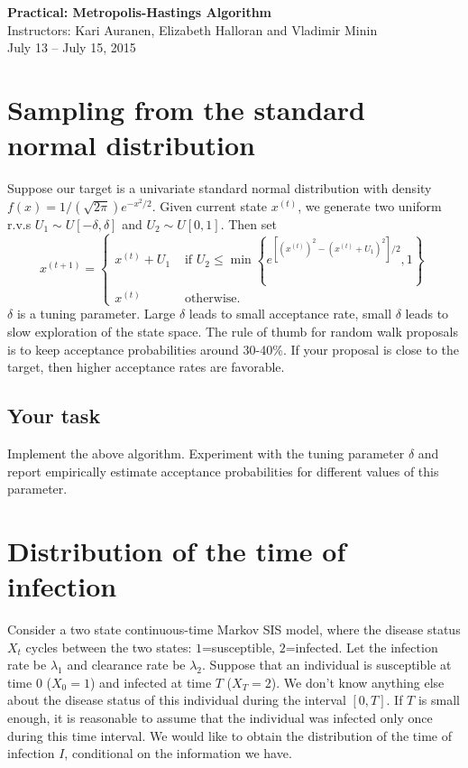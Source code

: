 \documentclass[11pt]{article}
\numberwithin{algorithm}{section}
\theoremstyle{remark}
\theoremstyle{definition}
\numberwithin{equation}{section}
\numberwithin{figure}{section}
\begin{document}


\begin{center}
  \textbf{\Large Practical: Metropolis-Hastings Algorithm}\\
  {\large Instructors: Kari Auranen, Elizabeth Halloran and Vladimir Minin}\\
  {\large July 13 -- July 15, 2015}
\end{center}

\section*{Sampling from the standard normal distribution}
Suppose our target is a univariate standard normal distribution with density $f(x) = 1/(\sqrt{2\pi})e^{-x^2/2}$.
Given current state $x^{(t)}$, we generate two uniform r.v.s $U_1 \sim U[-\delta,\delta]$ and 
$U_2 \sim U[0,1]$. Then set
\[
x^{(t+1)} = 
\begin{cases}
  x^{(t)} + U_1 &\text{ if } U_2 \le \min\left\{e^{\left[\left(x^{(t)}\right)^2 - (x^{(t)}+U_1)^2\right]/2},1\right\} \\
  x^{(t)} & \text{ otherwise}.
\end{cases}
\]
$\delta$ is a tuning parameter. Large $\delta$ leads to small acceptance rate, small $\delta$ leads to slow
exploration of the state space. The rule of thumb for random walk proposals is to keep acceptance probabilities
around 30-40\%. If your proposal is close to the target, then higher acceptance rates are favorable.


\subsection*{Your task}
Implement the above algorithm. Experiment with the tuning parameter $\delta$ and report empirically estimate
acceptance probabilities for different values of this parameter.

\section*{Distribution of the time of infection}
Consider a two state continuous-time Markov SIS model, where the disease status $X_t$ cycles between the two states: 
$1$=susceptible, $2$=infected. Let the infection rate be $\lambda_1$ and clearance rate be $\lambda_2$.
Suppose that an individual is susceptible at time $0$ ($X_0 = 1$) and infected at time $T$ ($X_T=2$). We don't know
anything else about the disease status of this individual during the interval $[0,T]$. If $T$ is small enough, 
it is reasonable to assume that the individual was infected only once during this time interval. We would like 
to obtain the distribution of the time of infection $I$, conditional on the information we have.
\end{document}
